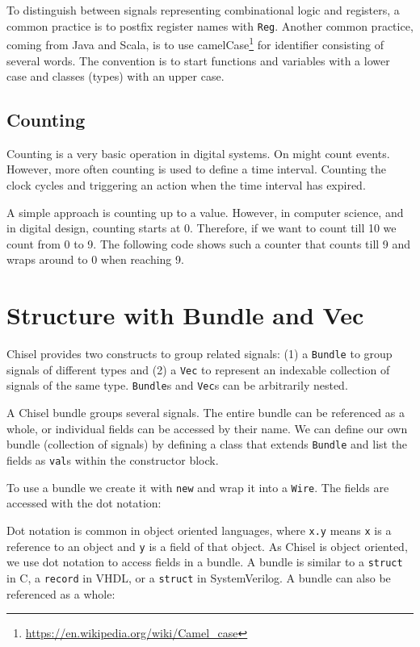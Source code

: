 \documentclass[%
    10pt,
    headinclude, footexclude,
    openright, %
    notitlepage,
    cleardoubleempty,
    headsepline,
    pointlessnumbers,
    bibtotoc, idxtotoc,
    ]{scrbook}
\newcommand{\code}[1]{{\small{\texttt{#1}}}}
\newcommand{\myref}[2]{\href{#1}{#2}}
\renewcommand{\myref}[2]{{#2}{\footnote{\url{#1}}}}
\begin{document}
\noindent To distinguish between signals representing combinational logic and registers,
a common practice is to postfix register names with \code{Reg}.
Another common practice, coming from Java and Scala, is to use
\myref{https://en.wikipedia.org/wiki/Camel_case}{camelCase} for
identifier consisting of several words. The convention is to start
functions and variables with a lower case and classes (types) with
an upper case.

\subsection{Counting}

Counting is a very basic operation in digital systems. On might count events.
However, more often counting is used to define a time interval. Counting the
clock cycles and triggering an action when the time interval has expired.

A simple approach is counting up to a value. However, in computer science,
and in digital design, counting starts at 0. Therefore, if we want to count till
10 we count from 0 to 9. The following code shows such a counter that counts
till 9 and wraps around to 0 when reaching 9.


\section{Structure with Bundle and Vec}

Chisel provides two constructs to group related signals: (1) a \code{Bundle} to group
signals of different types and (2) a \code{Vec} to represent an indexable collection of signals
of the same type.
\code{Bundle}s and \code{Vec}s can be arbitrarily nested.


A Chisel bundle groups several signals. The entire bundle can be referenced
as a whole, or individual fields can be accessed by their name.
We can define our own bundle (collection of signals) by defining a class that
extends \code{Bundle} and list the fields as \code{val}s within the constructor block.


\noindent To use a bundle we create it with \code{new} and wrap it into a \code{Wire}.
The fields are accessed with the dot notation:


Dot notation is common in object oriented languages, where \code{x.y} means
\code{x} is a reference to an object and \code{y} is a field of that object.
As Chisel is object oriented, we use dot notation to access fields in a bundle.
A bundle is similar to a \code{struct} in C, a \code{record} in VHDL, or a
\code{struct} in SystemVerilog.
A bundle can also be referenced as a whole:
\end{document}

